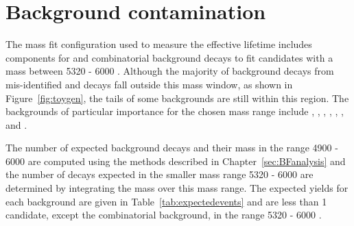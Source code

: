 \section{Background contamination}
\label{sec:BKGcontaim}
The mass fit configuration used to measure the \bsmumu effective lifetime includes components for \bsmumu and combinatorial background decays to fit candidates with a \bs mass between 5320 - 6000 \mevcc. Although the majority of background decays from mis-identified and \bdmumu decays fall outside this mass window, as shown in Figure~\ref{fig:toygen}, the tails of some backgrounds are still within this region. The backgrounds of particular importance for the chosen mass range include \bdmumu, \bhh, \lambdab, \bdpimunu, \bsKmunu, \bupimumu, \bdpimumu and \bcjpsimunu.%

The number of expected background decays and their mass \pdfs in the range 4900 - 6000 \mevcc are computed using the methods described in Chapter~\ref{sec:BFanalysis} and the number of decays expected in the smaller mass range 5320 - 6000 \mevcc are determined by integrating the mass \pdfs over this mass range. The expected yields for each background are given in Table~\ref{tab:expectedevents} and are less than 1 candidate, except the combinatorial background, in the range 5320 - 6000 \mevcc.  

